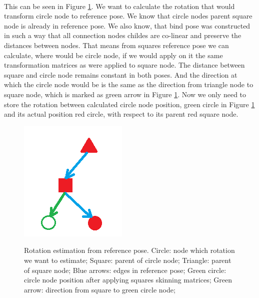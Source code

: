 \paragraph{}
This can be seen in Figure \ref{fig:DoF_estimation_ilu}. We want to calculate the rotation that would transform circle node to reference pose. We know that circle nodes parent square node is already in reference pose. We also know, that bind pose was constructed in such a way that all connection nodes childes are co-linear and preserve the distances between nodes. That means from squares reference pose we can calculate, where would be circle node, if we would apply on it the same transformation matrices as were applied to square node. The distance between square and circle node remains constant in both poses. And the direction at which the circle node would be is the same as the direction from triangle node to square node, which is marked as green arrow in Figure \ref{fig:DoF_estimation_ilu}. Now we only need to store the rotation between calculated circle node position, green circle in Figure \ref{fig:DoF_estimation_ilu} and its actual position red circle, with respect to its parent red square node.

\begin{figure}[h]
    \centering
    \includegraphics[]{images/DoF_estimation.png}
    \label{fig:DoF_estimation_ilu}
    \caption[Rotation estimation from reference pose]{Rotation estimation from reference pose. Circle: node which rotation we want to estimate; Square: parent of circle node; Triangle: parent of square node; Blue arrows: edges in reference pose; Green circle: circle node position after applying squares skinning matrices; Green arrow: direction from square to green circle node;}
\end{figure}

